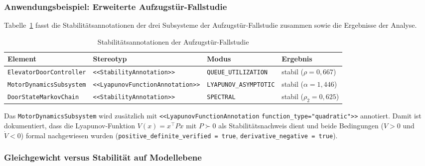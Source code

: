 ﻿\documentclass[a4paper,12pt]{scrreprt}
\theoremstyle{definition}
\begin{document}
\subsubsection{Anwendungsbeispiel: Erweiterte Aufzugstür-Fallstudie}

Tabelle~\ref{tab:elevator-stability} fasst die Stabilitätsannotationen der
drei Subsysteme der Aufzugstür-Fallstudie zusammen sowie die Ergebnisse der
Analyse.

\begin{table}
	\centering
	\begin{tabular}{@{}llll@{}}
		\toprule
		\textbf{Element} & \textbf{Stereotyp} & \textbf{Modus}
		& \textbf{Ergebnis} \\
		\midrule
		\texttt{ElevatorDoor}\newline\texttt{Controller}
		& \texttt{<<Stability}\newline\texttt{Annotation>>}
		& \texttt{QUEUE\_}\newline\texttt{UTILIZATION}
		& stabil ($\rho = 0{,}667$) \\[6pt]
		\texttt{MotorDynamics}\newline\texttt{Subsystem}
		& \texttt{<<Lyapunov}\newline\texttt{FunctionAnnotation>>}
		& \texttt{LYAPUNOV\_}\newline\texttt{ASYMPTOTIC}
		& stabil ($\alpha = 1{,}446$) \\[6pt]
		\texttt{DoorState}\newline\texttt{MarkovChain}
		& \texttt{<<Stability}\newline\texttt{Annotation>>}
		& \texttt{SPECTRAL}
		& stabil ($\rho_2 = 0{,}625$) \\
		\bottomrule
	\end{tabular}
	\caption{Stabilitätsannotationen der Aufzugstür-Fallstudie}
	\label{tab:elevator-stability}
\end{table}

Das \texttt{MotorDynamicsSubsystem} wird zusätzlich mit
\texttt{<<LyapunovFunctionAnno\newline tation} \texttt{function\_type="quadratic">>}
annotiert. Damit ist dokumentiert, dass die Lyapunov-Funktion
$V(x) = x^\top P x$ mit $P \succ 0$ als Stabilitätsnachweis dient und
beide Bedingungen ($V > 0$ und $\dot{V} < 0$) formal nachgewiesen wurden
(\texttt{positive\_definite\_veri\newline fied = true},
\texttt{derivative\_negative = true}).

\subsubsection{Gleichgewicht versus Stabilität auf Modellebene}
\end{document}
